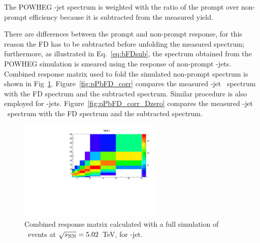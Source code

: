 The POWHEG \Dstar-jet spectrum is weighted with the ratio of the prompt over non-prompt efficiency because it is subtracted from the measured yield.

There are differences between the prompt and non-prompt response, for this reason the FD has to be subtracted before unfolding the measured spectrum; furthermore, as illustrated in Eq.~\ref{eq:bFDsub}, the spectrum obtained
from the POWHEG simulation is smeared using the response of non-prompt \Dstar-jets. Combined response matrix used to fold the simulated non-prompt spectrum is shown in Fig~\ref{fig:pPb_ResponseMatrix_nonprompt}.
Figure~\ref{fig:pPbFD_corr} compares the measured \Dstar-jet \pt\ spectrum with the FD spectrum and the subtracted spectrum.
Similar procedure is also employed for \Dzero-jets. %
Figure~\ref{fig:pPbFD_corr_Dzero} compares the measured \Dzero-jet \pt\ spectrum with the FD spectrum and the subtracted spectrum.

\begin{figure}[bth]
\centering
\includegraphics[width=0.6\textwidth]{pPbplots/ResponseMatrix/combMatrixFD_DjetExcl5}
\caption{Combined response matrix calculated with a full simulation of \pPb\ events at $\sqrt{s_{\rm NN}}=5.02$~TeV, for \Dstar-jet.}
\label{fig:pPb_ResponseMatrix_nonprompt}
\end{figure}

